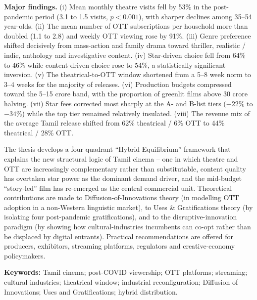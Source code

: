 \medskip
\noindent
\textbf{Major findings.}
(i) Mean monthly theatre visits fell by 53\% in the post-pandemic
period (3.1 to 1.5 visits, $p<0.001$), with sharper declines among
35--54 year-olds.  (ii) The mean number of OTT subscriptions per
household more than doubled (1.1 to 2.8) and weekly OTT viewing rose
by 91\%.  (iii) Genre preference shifted decisively from mass-action
and family drama toward thriller, realistic / indie, anthology and
investigative content.  (iv) Star-driven choice fell from 64\% to
46\% while content-driven choice rose to 54\%, a statistically
significant inversion.  (v) The theatrical-to-OTT window shortened
from a 5--8 week norm to 3--4 weeks for the majority of releases.
(vi) Production budgets compressed toward the 5--15 crore band, with
the proportion of greenlit films above 30 crore halving.  (vii) Star
fees corrected most sharply at the A- and B-list tiers ($-22\%$ to
$-34\%$) while the top tier remained relatively insulated.
(viii) The revenue mix of the average Tamil release shifted from
62\% theatrical / 6\% OTT to 44\% theatrical / 28\% OTT.

\medskip
\noindent
The thesis develops a four-quadrant ``Hybrid Equilibrium'' framework
that explains the new structural logic of Tamil cinema -- one in which
theatre and OTT are increasingly complementary rather than
substitutable, content quality has overtaken star power as the
dominant demand driver, and the mid-budget ``story-led'' film has
re-emerged as the central commercial unit.  Theoretical contributions
are made to Diffusion-of-Innovations theory (in modelling OTT adoption
in a non-Western linguistic market), to Uses \& Gratifications theory
(by isolating four post-pandemic gratifications), and to the
disruptive-innovation paradigm (by showing how cultural-industries
incumbents can co-opt rather than be displaced by digital entrants).
Practical recommendations are offered for producers, exhibitors,
streaming platforms, regulators and creative-economy policymakers.

\bigskip
\noindent
\textbf{Keywords:} Tamil cinema; post-COVID viewership; OTT platforms;
streaming; cultural industries; theatrical window; industrial
reconfiguration; Diffusion of Innovations; Uses and Gratifications;
hybrid distribution.
\clearpage
